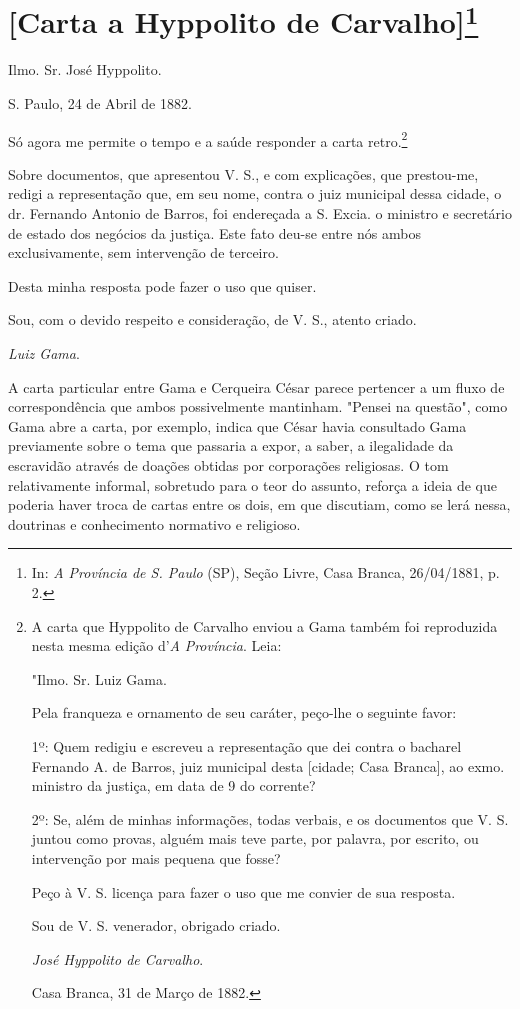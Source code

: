 {\chapter{{[}Carta a Hyppolito de Carvalho{]}\footnote[*]{In: \emph{A
  Província de S. Paulo} (SP), Seção Livre, Casa Branca, 26/04/1881, p.
  2.}}

Ilmo. Sr. José Hyppolito.

S. Paulo, 24 de Abril de 1882.

Só agora me permite o tempo e a saúde responder a carta retro.\footnote{
  A carta que Hyppolito de Carvalho enviou a Gama também foi reproduzida
  nesta mesma edição d'\emph{A} \emph{Província}. Leia:

  "Ilmo. Sr. Luiz Gama.

  Pela franqueza e ornamento de seu caráter, peço-lhe o seguinte favor:

  1º: Quem redigiu e escreveu a representação que dei contra o bacharel
  Fernando A. de Barros, juiz municipal desta {[}cidade; Casa Branca{]},
  ao exmo. ministro da justiça, em data de 9 do corrente?

  2º: Se, além de minhas informações, todas verbais, e os documentos que
  V. S. juntou como provas, alguém mais teve parte, por palavra, por
  escrito, ou intervenção por mais pequena que fosse?

  Peço à V. S. licença para fazer o uso que me convier de sua resposta.

  Sou de V. S. venerador, obrigado criado.

  \emph{José Hyppolito de Carvalho}.

  Casa Branca, 31 de Março de 1882.}

Sobre documentos, que
apresentou V. S., e com explicações, que prestou-me, redigi a
representação que, em seu nome, contra o juiz municipal dessa cidade, o
dr. Fernando Antonio de Barros, foi endereçada a S. Excia. o ministro e
secretário de estado dos negócios da justiça. Este fato deu-se entre nós
ambos exclusivamente, sem intervenção de terceiro.

Desta minha resposta pode fazer o uso que quiser.

Sou, com o devido respeito e consideração, de V. S., atento criado.

\emph{Luiz Gama}.

\pagebreak
\mbox{}\vfill
\thispagestyle{empty}

{\small\noindent
A carta particular entre Gama e Cerqueira César parece pertencer a
um fluxo de correspondência que ambos possivelmente mantinham. "Pensei
na questão", como Gama abre a carta, por exemplo, indica que César havia
consultado Gama previamente sobre o tema que passaria a expor, a saber,
a ilegalidade da escravidão através de doações obtidas por corporações
religiosas. O tom relativamente informal, sobretudo para o teor do
assunto, reforça a ideia de que poderia haver troca de cartas entre os
dois, em que discutiam, como se lerá nessa, doutrinas e conhecimento
normativo e religioso. }

}
